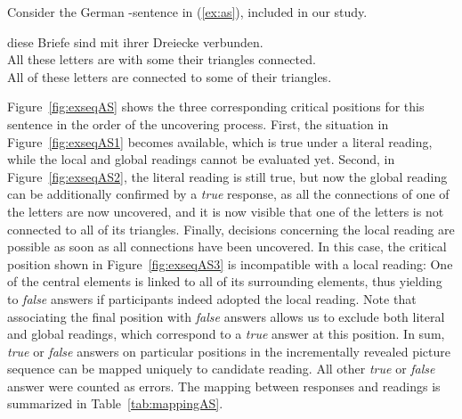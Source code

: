 \documentclass[fleqn,reqno,10pt,draft]{article}
\newcommand{\as}{\acro{as}}
\begin{document}
Consider the German \as-sentence in (\ref{ex:as}), included in our study.
\begin{exe}
\ex \gll {} diese Briefe sind mit  ihrer Dreiecke
  verbunden.\label{ex:as}\\
All these letters are with some their triangles connected.\\
\trans All of these letters are connected to some of their triangles.
\end{exe}
Figure~\ref{fig:exseqAS} shows the three corresponding critical
positions for this sentence in the order of the uncovering
process. First, the situation in Figure~\ref{fig:exseqAS1} becomes
available, which is true under a literal reading, while the local and
global readings cannot be evaluated yet. Second, in
Figure~\ref{fig:exseqAS2}, the literal reading is still true, but now
the global reading can be additionally confirmed by a \emph{true}
response, as all the connections of one of the letters are now
uncovered, and it is now visible that one of the letters is not
connected to all of its triangles. Finally, decisions concerning the
local reading are possible as soon as all connections have been
uncovered. In this case, the critical position shown in
Figure~\ref{fig:exseqAS3} is incompatible with a local reading: One of
the central elements is linked to all of its surrounding elements,
thus yielding to \emph{false} answers if participants indeed adopted
the local reading. Note that associating the final position with
\emph{false} answers allows us to exclude both literal and global
readings, which correspond to a \emph{true} answer at this
position. In sum, \emph{true} or \emph{false} answers on particular
positions in the incrementally revealed picture sequence can be mapped
uniquely to candidate reading. All other \emph{true} or \emph{false}
answer were counted as errors. The mapping between responses and
readings is summarized in Table~\ref{tab:mappingAS}.
\end{document}
